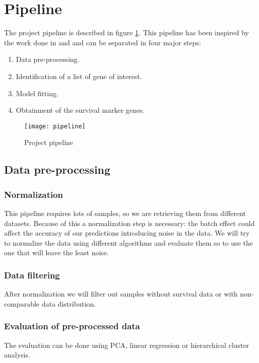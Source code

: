 \documentclass[fleqn,10pt]{SelfArx} %
\begin{document}
\section{Pipeline}
The project pipeline is described in figure \ref{fig:pipeline}.
This pipeline has been inspired by the work done in \cite{Martinez-Romero2018-gp} and \cite{Wang2020-mr} and can be separated in four major steps:

\begin{enumerate}
	\item Data pre-processing.
	\item Identification of a list of gene of interest.
	\item Model fitting.
	\item Obtainment of the survival marker genes.
\end{enumerate}

\begin{figure}[ht]\centering %
	\texttt{[image: pipeline]}
	\caption{Project pipeline}
	\label{fig:pipeline}
\end{figure}

	\subsection{Data pre-processing}

		\subsubsection{Normalization}
		This pipeline requires lots of samples, so we are retrieving them from different datasets.
		Because of this a normalization step is necessary: the batch effect could affect the accuracy of our predictions introducing noise in the data.
		We will try to normalize the data using different algorithms and evaluate them so to use the one that will leave the least noise.

		\subsubsection{Data filtering}
		After normalization we will filter out samples without survival data or with non-comparable data distribution.

		\subsubsection{Evaluation of pre-processed data}
		The evaluation can be done using PCA, linear regression or hierarchical cluster analysis.
\end{document}

